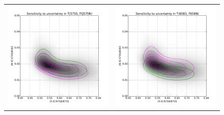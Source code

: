 \documentclass[preprint]{aastex}
\begin{document}
\begin{figure}[p]
\begin{tabular}{ll}
    \includegraphics{ratio-sensitivity-T5755-FQ575N} &
    \includegraphics{ratio-sensitivity-T6583-F658N} \\

\end{tabular}
\end{figure}
\end{document}

